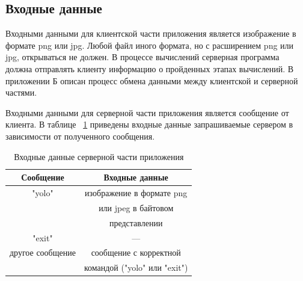 \documentclass[a4paper,english]{G2-105}
\begin{document}
\subsection{Входные данные}\ttl
\par Входными данными для клиентской части приложения является изображение в формате png или jpg. Любой файл иного формата, но с расширением png или jpg, открываться не должен. В процессе вычислений серверная программа должна отправлять клиенту информацию о пройденных этапах вычислений. В приложении Б описан процесс обмена данными между клиентской и серверной частями.
\par Входными данными для серверной части приложения является сообщение от клиента. В таблице ~\ref{input} приведены входные данные запрашиваемые сервером в зависимости от полученного сообщения.
\begin{longtable}{|c|c|}
    \caption{Входные данные серверной части приложения} \label{input} \\ \hline
    Сообщение        & Входные данные            \\ \hline \endhead
    "yolo"           & изображение в формате png \\ 
                     & или jpeg в байтовом       \\
                     & представлении             \\ \hline
    "exit"           & ---                       \\ \hline
    другое сообщение & сообщение с корректной    \\  
    	                 & командой ("yolo" или "exit") \\
\end{longtable}
\ttl
\end{document}
